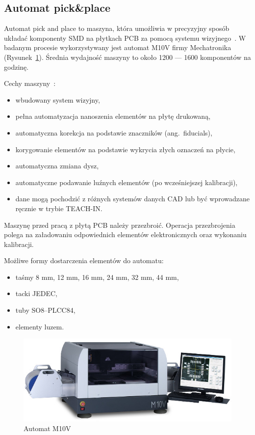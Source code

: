 \subsection{Automat pick\&place}
Automat pick and place to maszyna, która umożliwia w precyzyjny sposób układać komponenty SMD na płytkach PCB za pomocą systemu wizyjnego~\cite{automatp&p1}. W badanym procesie wykorzystywany jest automat M10V firmy Mechatronika (Rysunek~\ref{automat_pick_place}). Średnia wydajność maszyny to około 1200 --- 1600 komponentów na godzinę.

\breakparagraph{}
Cechy maszyny~\cite{automatp&p2}:
\begin{itemize}
	\item wbudowany system wizyjny,
	\item pełna automatyzacja nanoszenia elementów na płytę drukowaną,
	\item automatyczna korekcja na podstawie znaczników (ang.\ fiducials),
	\item korygowanie elementów na podstawie wykrycia złych oznaczeń na płycie,
	\item automatyczna zmiana dysz,
	\item automatyczne podawanie luźnych elementów (po wcześniejszej kalibracji),
	\item dane mogą pochodzić z różnych systemów danych CAD lub być wprowadzane ręcznie w trybie TEACH-IN\@.
\end{itemize}

\newpage
Maszynę przed pracą z płytą PCB należy przezbroić. Operacja przezbrojenia polega na załadowaniu odpowiednich elementów elektronicznych oraz wykonaniu kalibracji.

\breakparagraph{}
Możliwe formy dostarczenia elementów do automatu:
\begin{itemize}
	\item taśmy 8 mm, 12 mm, 16 mm, 24 mm, 32 mm, 44 mm,
	\item tacki JEDEC,
	\item tuby SO8–PLCC84,
	\item elementy luzem.
\end{itemize}

\begin{figure}[H]
	\centering
	\includegraphics[scale=0.45]{./chapters/chapter2/M10V.jpeg}
	\caption{Automat M10V~\cite{automatp&p2}}
	\label{automat_pick_place}
\end{figure}


